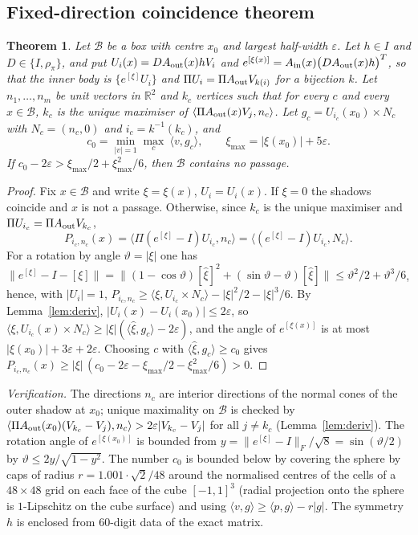 \documentclass[11pt]{amsart}
\newtheorem{theorem}{Theorem}[section]
\theoremstyle{definition}
\newcommand{\R}{\mathbb{R}}
\newcommand{\Prj}{\Pi}
\newcommand{\ip}[2]{\langle #1,#2\rangle}
\newcommand{\abs}[1]{\lvert #1\rvert}
\newcommand{\norm}[1]{\lVert #1\rVert}
\begin{document}
\subsection{Fixed-direction coincidence theorem}
\begin{theorem}\label{thm:local2}
Let $\mathcal B$ be a box with centre $x_0$ and largest half-width $\varepsilon$. Let $h\in I$ and $D\in\{I,\rho_\pi\}$, and put
$U_i(x)=D A_{\rm out}(x)hV_i$ and $e^{[\xi(x)]}=A_{\rm in}(x)\bigl(DA_{\rm out}(x)h\bigr)^{T}$, so that the inner body is
$\{e^{[\xi]}U_i\}$ and $\Prj U_i=\Prj A_{\rm out}V_{k(i)}$ for a bijection $k$. Let $n_1,\dots,n_m$ be unit vectors in
$\R^2$ and $k_c$ vertices such that for every $c$ and every $x\in\mathcal B$, $k_c$ is the unique maximiser of
$\ip{\Prj A_{\rm out}(x)V_j}{n_c}$. Let $g_c=U_{i_c}(x_0)\times N_c$ with $N_c=(n_c,0)$ and $i_c=k^{-1}(k_c)$, and
\[
c_0=\min_{\abs v=1}\max_c\ \ip{v}{g_c},\qquad \xi_{\max}=\abs{\xi(x_0)}+5\varepsilon .
\]
If $c_0-2\varepsilon>\xi_{\max}/2+\xi_{\max}^2/6$, then $\mathcal B$ contains no passage.
\end{theorem}
\begin{proof}
Fix $x\in\mathcal B$ and write $\xi=\xi(x)$, $U_i=U_i(x)$. If $\xi=0$ the shadows coincide and $x$ is not a
passage. Otherwise, since $k_c$ is the unique maximiser and $\Prj U_{i_c}=\Prj A_{\rm out}V_{k_c}$,
\[
P_{i_c,n_c}(x)=\ip{\Prj(e^{[\xi]}-I)U_{i_c}}{n_c}=\ip{(e^{[\xi]}-I)U_{i_c}}{N_c}.
\]
For a rotation by angle $\vartheta=\abs\xi$ one has
$\norm{e^{[\xi]}-I-[\xi]}=\norm{(1-\cos\vartheta)[\hat\xi]^2+(\sin\vartheta-\vartheta)[\hat\xi]}\le\vartheta^2/2+\vartheta^3/6$,
hence, with $\abs{U_i}=1$, $P_{i_c,n_c}\ge\ip{\xi}{U_{i_c}\times N_c}-\abs\xi^2/2-\abs\xi^3/6$.
By Lemma~\ref{lem:deriv}, $\abs{U_i(x)-U_i(x_0)}\le2\varepsilon$, so $\ip{\xi}{U_{i_c}(x)\times N_c}\ge\abs\xi(\ip{\hat\xi}{g_c}-2\varepsilon)$,
and the angle of $e^{[\xi(x)]}$ is at most $\abs{\xi(x_0)}+3\varepsilon+2\varepsilon$. Choosing $c$ with
$\ip{\hat\xi}{g_c}\ge c_0$ gives $P_{i_c,n_c}(x)\ge\abs\xi\,(c_0-2\varepsilon-\xi_{\max}/2-\xi_{\max}^2/6)>0$.
\end{proof}
\noindent\emph{Verification.} The directions $n_c$ are interior directions of the normal cones of the outer shadow at
$x_0$; unique maximality on $\mathcal B$ is checked by $\ip{\Prj A_{\rm out}(x_0)(V_{k_c}-V_j)}{n_c}>2\varepsilon\abs{V_{k_c}-V_j}$
for all $j\ne k_c$ (Lemma~\ref{lem:deriv}). The rotation angle of $e^{[\xi(x_0)]}$ is bounded from
$y=\norm{e^{[\xi]}-I}_F/\sqrt8=\sin(\vartheta/2)$ by $\vartheta\le 2y/\sqrt{1-y^2}$. The number $c_0$ is bounded below by
covering the sphere by caps of radius $r=1.001\cdot\sqrt2/48$ around the normalised centres of the cells of a
$48\times48$ grid on each face of the cube $[-1,1]^3$ (radial projection onto the sphere is $1$-Lipschitz on the cube surface) and using
$\ip{v}{g}\ge\ip{p}{g}-r\abs g$. The symmetry $h$ is enclosed from $60$-digit data of the exact matrix.
\end{document}
